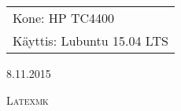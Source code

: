 \documentclass[main.tex]{subfiles}
\begin{document}
\thispagestyle{empty}
\begin{tabular}[t]{l}
Kone: HP TC4400\\
Käyttis: Lubuntu 15.04 LTS
\end{tabular}
\hfill 8.11.2015

{\scshape\Large{Latexmk}}
\end{document}
